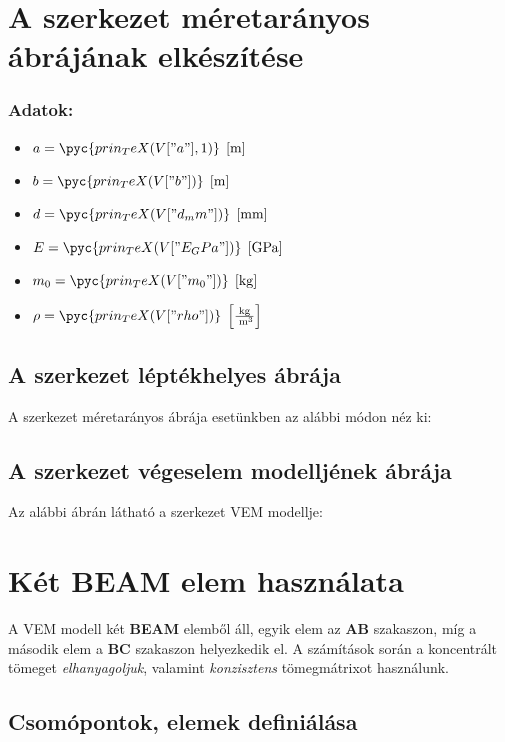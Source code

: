 \documentclass[12pt,a4paper]{article}
\def\m{\; \left[\mathrm{m}\right]}
\def\mili{\; \left[\mathrm{mm}\right]}
\def\Gpa{\; \left[\mathrm{GPa}\right]}
\def\kg{\; \left[\mathrm{kg}\right]}
\def\kgpm{\; \left[\mathrm{\frac{kg}{\; m^3}}\right]}
\begin{document}


\section{A szerkezet méretarányos ábrájának elkészítése}
\subsubsection*{Adatok:}

\begin{multicols}{2}
    \begin{itemize}
        \item $a=\pyc{prin_TeX(V["a"],1)}\m$
        \item $b=\pyc{prin_TeX(V["b"])}\m$
        \item $d=\pyc{prin_TeX(V["d_mm"])}\mili$
    \end{itemize}
    \columnbreak
    \begin{itemize}
        \item $E=\pyc{prin_TeX(V["E_GPa"])} \Gpa$
        \item $m_0=\pyc{prin_TeX(V["m_0"])} \kg$
        \item $\rho=\pyc{prin_TeX(V["rho"])} \kgpm $
    \end{itemize}
\end{multicols}

\subsection{A szerkezet léptékhelyes ábrája}
A szerkezet méretarányos ábrája esetünkben az alábbi módon néz ki:

\subsection{A szerkezet végeselem modelljének ábrája}
Az alábbi ábrán látható a szerkezet VEM modellje:

\section{Két BEAM elem használata}
A VEM modell két \textbf{BEAM} elemből áll, egyik elem az \textbf{AB} szakaszon,
míg a második elem a \textbf{BC} szakaszon helyezkedik el. A számítások során
a koncentrált tömeget \textit{elhanyagoljuk}, valamint \textit{konzisztens} tömegmátrixot
használunk.
\subsection{Csomópontok, elemek definiálása}
\end{document}
